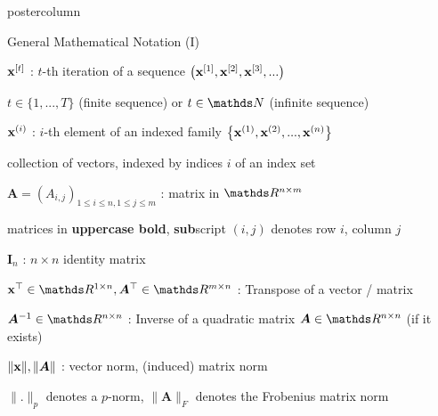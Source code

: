 \documentclass[11pt,compress,t,notes=noshow, xcolor=table]{beamer}
\begin{document}
\begin{frame}[fragile]{}
\begin{columns}
\begin{column}{.31\textwidth}
\begin{beamercolorbox}[center]{postercolumn}
\begin{minipage}{.98\textwidth}
{\begin{myblock}{General Mathematical Notation (I)}
						\begin{codebox}
						    $\mathbf{x}^{[t]}$ :  $t$-th iteration of a sequence $\left(\mathbf{x}^{[1]}, \mathbf{x}^{[2]}, \mathbf{x}^{[3]}, ...\right)$
						\end{codebox}
						\hspace*{1ex} $t \in \{1, ..., T\}$ (finite sequence) or $t \in \N$ (infinite sequence)
						\\
						\begin{codebox}
						    $\mathbf{x}^{(i)}$ :  $i$-th element of an indexed family $\left\{\mathbf{x}^{(1)}, \mathbf{x}^{(2)}, ..., \mathbf{x}^{(n)}\right\}$
						\end{codebox}
						\hspace*{1ex} collection of vectors, indexed by indices $i$ of an index set\\
						\begin{codebox}
						    $\bm{A} = \left(A_{i,j}\right)_{1\le i \le n, 1 \le j \le m}$ :  matrix in $\R^{n \times m} $
						\end{codebox}
						\hspace*{1ex} matrices in \textbf{uppercase bold}, \textbf{sub}script $(i,j)$ denotes row $i$, column $j$
						\\
						\begin{codebox}
							$\mathbf{I}_n$ : $n \times n$ identity matrix
						\end{codebox}
						\hspace*{1ex} %
						\begin{codebox}
						    $\xv^\top \in \R^{1 \times n}, \bm{A}^\top \in \R^{m \times n}$ :  Transpose of a vector / matrix
						\end{codebox}
						\hspace*{1ex}
						\begin{codebox}
						    $\bm{A}^{-1} \in \R^{n \times n}$ :  Inverse of a quadratic matrix $\bm{A} \in \R^{n \times n}$ (if it exists)
						\end{codebox}
						\hspace*{1ex}
						\begin{codebox}
						    $\|\mathbf{x}\|, \|\bm{A}\|$ : vector norm, (induced) matrix norm
						\end{codebox}
						\hspace*{1ex} %
						$\|.\|_p$ denotes a $p$-norm, $\|\bm{A}\|_F$ denotes the Frobenius matrix norm

\end{myblock}}
\end{minipage}
\end{beamercolorbox}
\end{column}
\end{columns}
\end{frame}
\end{document}
